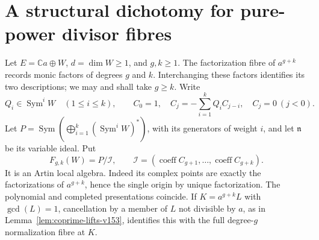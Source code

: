 \documentclass[11pt,reqno]{amsart}
\numberwithin{equation}{section}
\theoremstyle{definition}\newtheorem{definition}[theorem]{Definition}
\theoremstyle{remark}\newtheorem{remark}[theorem]{Remark}
\newcommand{\C}{\mathbb C}\newcommand{\Q}{\mathbb Q}
\DeclareMathOperator{\Sym}{Sym}\DeclareMathOperator{\Gr}{Gr}
\begin{document}
\section{A structural dichotomy for pure-power divisor fibres}
\label{sec:reciprocal-v153}
Let $E=\C a\oplus W$, $d=\dim W\geq1$, and $g,k\geq1$.
The factorization fibre of $a^{g+k}$ records monic factors of degrees
$g$ and $k$. Interchanging these factors identifies its two descriptions;
we may and shall take $g\geq k$. Write
\[
 Q_i\in\Sym^iW\quad(1\leq i\leq k),\qquad
 C_0=1,\quad C_j=-\sum_{i=1}^kQ_i C_{j-i},\quad C_j=0\ (j<0).
\]
Let $P=\Sym(\bigoplus_{i=1}^k(\Sym^iW)^*)$, with its generators
of weight $i$, and let $\mathfrak n$ be its variable ideal. Put
\begin{equation}\label{eq:reciprocal-algebra-v153}
 F_{g,k}(W)=P/\mathcal I,\qquad
 \mathcal I=(\operatorname{coeff}C_{g+1},\ldots,
                                    \operatorname{coeff}C_{g+k}).
\end{equation}
It is an Artin local algebra. Indeed its complex points are exactly
the factorizations of $a^{g+k}$, hence the single origin by unique
factorization. The polynomial and completed presentations coincide.
If $K=a^{g+k}L$ with $\gcd(L)=1$, cancellation by a member of $L$
not divisible by $a$, as in Lemma~\ref{lem:coprime-lifts-v153},
identifies this with the full degree-$g$ normalization fibre at $K$.
\end{document}
